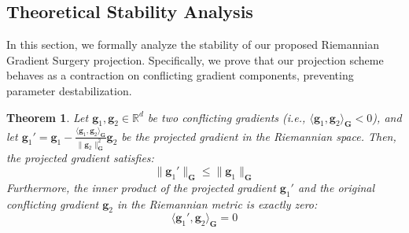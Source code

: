 \documentclass{article}
\theoremstyle{plain}
\newtheorem{theorem}{Theorem}[section]
\theoremstyle{definition}
\theoremstyle{remark}
\begin{document}
\subsection{Theoretical Stability Analysis}
In this section, we formally analyze the stability of our proposed Riemannian Gradient Surgery projection. Specifically, we prove that our projection scheme behaves as a contraction on conflicting gradient components, preventing parameter destabilization.

\begin{theorem}
Let $\mathbf{g}_1, \mathbf{g}_2 \in \mathbb{R}^d$ be two conflicting gradients (i.e., $\langle \mathbf{g}_1, \mathbf{g}_2 \rangle_{\mathbf{G}} < 0$), and let $\mathbf{g}_1' = \mathbf{g}_1 - \frac{\langle \mathbf{g}_1, \mathbf{g}_2 \rangle_{\mathbf{G}}}{\|\mathbf{g}_2\|_{\mathbf{G}}^2} \mathbf{g}_2$ be the projected gradient in the Riemannian space. Then, the projected gradient satisfies:
\begin{equation}
    \|\mathbf{g}_1'\|_{\mathbf{G}} \le \|\mathbf{g}_1\|_{\mathbf{G}}
\end{equation}
Furthermore, the inner product of the projected gradient $\mathbf{g}_1'$ and the original conflicting gradient $\mathbf{g}_2$ in the Riemannian metric is exactly zero:
\begin{equation}
    \langle \mathbf{g}_1', \mathbf{g}_2 \rangle_{\mathbf{G}} = 0
\end{equation}
\end{theorem}
\end{document}
